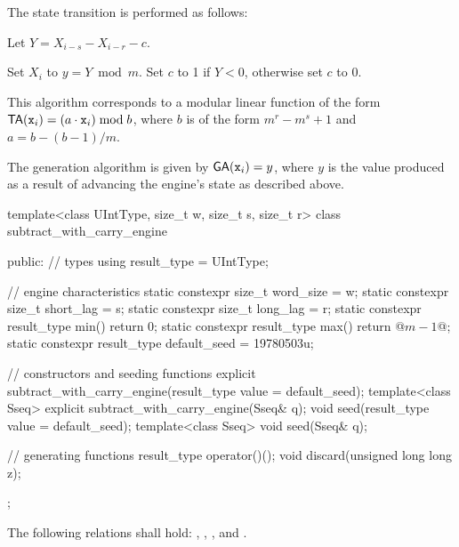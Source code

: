 \pnum
The state transition%
%
is performed as follows:
\begin{enumeratea}
 \item
   Let $ Y = X_{i-s} - X_{i-r} - c $.
 \item
   Set $X_i$ to $ y = Y \bmod m $.
   Set $c$ to 1 if $Y < 0$,
   otherwise set $c$ to 0.
\end{enumeratea}
\begin{note}
 This algorithm corresponds
 to a modular linear function
 of the form
 $ \mathsf{TA}(\texttt{x}_{i}) = (a \cdot \texttt{x}_{i}) \bmod b $,
 where $b$ is of the form
 $ m^r - m^s + 1 $
 and $ a = b - (b-1) / m $.
\end{note}

\pnum
The generation algorithm%
%
is given by
$ \mathsf{GA}(\texttt{x}_{i}) = y $,
where
 $y$
is the value produced
as a result
of advancing the engine's state
as described above.

%
\begin{codeblock}
template<class UIntType, size_t w, size_t s, size_t r>
  class subtract_with_carry_engine {
  public:
    // types
    using result_type = UIntType;

    // engine characteristics
    static constexpr size_t word_size = w;
    static constexpr size_t short_lag = s;
    static constexpr size_t long_lag = r;
    static constexpr result_type min() { return 0; }
    static constexpr result_type max() { return @$m - 1$@; }
    static constexpr result_type default_seed = 19780503u;

    // constructors and seeding functions
    explicit subtract_with_carry_engine(result_type value = default_seed);
    template<class Sseq> explicit subtract_with_carry_engine(Sseq& q);
    void seed(result_type value = default_seed);
    template<class Sseq> void seed(Sseq& q);

    // generating functions
    result_type operator()();
    void discard(unsigned long long z);
  };
\end{codeblock}

\pnum
The following relations shall hold:
  ,
  ,
  ,
and
  .


